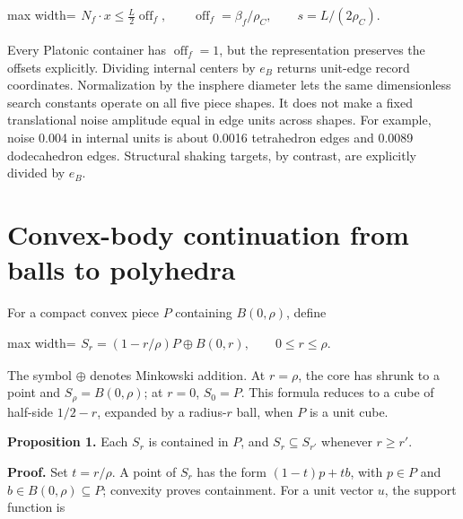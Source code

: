 \documentclass[11pt,a4paper]{article}
\begin{document}
\begin{center}\begin{adjustbox}{max width=\linewidth}$\displaystyle\begin{aligned}
N_f\cdot x\le \frac L2\operatorname{off}_f,
\qquad \operatorname{off}_f=\beta_f/\rho_C,
\qquad s=L/(2\rho_C).
\end{aligned}$\end{adjustbox}\end{center}

Every Platonic container has \(\operatorname{off}_f=1\), but the representation preserves the offsets explicitly. Dividing internal centers by \(e_B\) returns unit-edge record coordinates. Normalization by the insphere diameter lets the same dimensionless search constants operate on all five piece shapes. It does not make a fixed translational noise amplitude equal in edge units across shapes. For example, noise 0.004 in internal units is about 0.0016 tetrahedron edges and 0.0089 dodecahedron edges. Structural shaking targets, by contrast, are explicitly divided by \(e_B\).

\section{Convex-body continuation from balls to polyhedra}

For a compact convex piece \(P\) containing \(B(0,\rho)\), define

\begin{center}\begin{adjustbox}{max width=\linewidth}$\displaystyle\begin{aligned}
S_r=(1-r/\rho)P\oplus B(0,r),\qquad 0\le r\le\rho.
\end{aligned}$\end{adjustbox}\end{center}

The symbol \(\oplus\) denotes Minkowski addition. At \(r=\rho\), the core has shrunk to a point and \(S_\rho=B(0,\rho)\); at \(r=0\), \(S_0=P\). This formula reduces to a cube of half-side \(1/2-r\), expanded by a radius-\(r\) ball, when \(P\) is a unit cube.

\textbf{Proposition 1.} Each \(S_r\) is contained in \(P\), and \(S_r\subseteq S_{r'}\) whenever \(r\ge r'\).

\textbf{Proof.} Set \(t=r/\rho\). A point of \(S_r\) has the form \((1-t)p+t b\), with \(p\in P\) and \(b\in B(0,\rho)\subseteq P\); convexity proves containment. For a unit vector \(u\), the support function is
\end{document}
